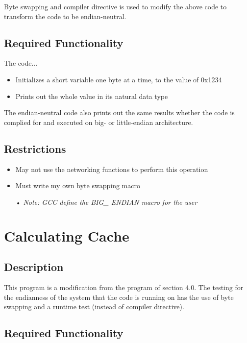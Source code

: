 \documentclass[letterpaper,10pt,onecolumn,compsoc]{IEEEtran}
\begin{document}
\noindent
Byte swapping and compiler directive is used to modify the above code to transform the code to be endian-neutral.

\subsection{Required Functionality}

\noindent
The code...

\begin{itemize}
	\item Initializes a short variable one byte at a time, to the value of 0x1234
	\item Prints out the whole value in its natural data type
\end{itemize}

\noindent
The endian-neutral code also prints out the same results whether the code is complied for and executed on big- or little-endian architecture.

\subsection{Restrictions}

\begin{itemize}
	\item May not use the networking functions to perform this operation
	\item Must write my own byte swapping macro
	\item[•] \textit{Note: GCC define the BIG\_ ENDIAN macro for the user}
\end{itemize}

\newpage

\section{Calculating Cache}

\subsection{Description}

\noindent
This program is a modification from the program of section 4.0. The testing for the endianness of the system that the code is running on has the use of byte swapping and a runtime test (instead of compiler directive).

\subsection{Required Functionality}
\end{document}
